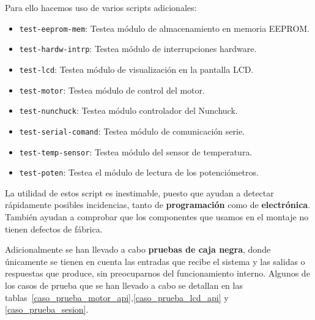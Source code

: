 Para ello hacemos uso de varios scripts adicionales:

\begin{itemize}
	\item \texttt{test-eeprom-mem}: Testea módulo de almacenamiento en memoria EEPROM. 
	\item \texttt{test-hardw-intrp}: Testea módulo de interrupciones hardware.
	\item \texttt{test-lcd}: Testea módulo de visualización en la pantalla LCD.
	\item \texttt{test-motor}: Testea módulo de control del motor.
	\item \texttt{test-nunchuck}: Testea módulo controlador del Nunchuck.
	\item \texttt{test-serial-comand}: Testea  módulo de comunicación serie. 
	\item \texttt{test-temp-sensor}: Testea  módulo del sensor de temperatura. 
	\item \texttt{test-poten}: Testea el módulo de lectura de los potenciómetros. 
\end{itemize}

La utilidad de estos script es inestimable, puesto que ayudan a detectar rápidamente posibles incidencias, tanto de \textbf{programación} como de \textbf{electrónica}. También ayudan a comprobar que los componentes que usamos en el montaje no tienen defectos de fábrica.



Adicionalmente se han llevado a cabo \textbf{pruebas de caja negra}, donde únicamente se tienen en cuenta las entradas que recibe el sistema y las salidas o respuestas que produce, sin preocuparnos del funcionamiento interno. Algunos de los casos de prueba que se han llevado a cabo se detallan en las tablas~\ref{caso_prueba_motor_api},\ref{caso_prueba_lcd_api} y \ref{caso_prueba_sesion}.


